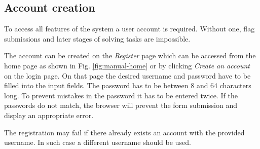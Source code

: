 \subsection{Account creation}
\label{chap:account-creation}

To access all features of the system a user account is required. Without one, flag submissions and later stages of solving tasks are impossible.

The account can be created on the \textit{Register} page which can be accessed from the home page as shown in Fig. \ref{fig:manual-home} or by clicking \textit{Create an account} on the login page. On that page the desired username and password have to be filled into the input fields. The password has to be between 8 and 64 characters long. To prevent mistakes in the password it has to be entered twice. If the passwords do not match, the browser will prevent the form submission and display an appropriate error.

The registration may fail if there already exists an account with the provided username. In such case a different username should be used.

